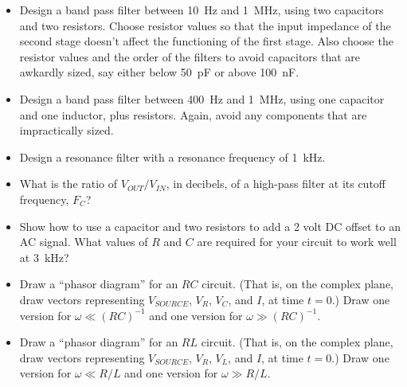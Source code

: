 \begin{itemize}

\item Design a band pass filter between 10~Hz and 1~MHz, using two capacitors and two resistors.  Choose resistor values so that the input impedance of the second stage doesn't affect the functioning of the first stage.  Also choose the resistor values and the order of the filters to avoid capacitors that are awkardly sized, say either below 50~pF or above 100~nF.

\item Design a band pass filter between 400~Hz and 1~MHz, using one capacitor and one inductor, plus resistors.  Again, avoid any components that are impractically sized.

\item Design a resonance filter with a resonance frequency of 1~kHz. 

\item What is the ratio of $V_{OUT}/V_{IN}$, in decibels, of a high-pass filter at its cutoff frequency, $F_C$?

\item Show how to use a capacitor and two resistors to add a 2 volt DC offset to an AC signal.  What values of $R$ and $C$ are required for your circuit to work well at 3~kHz?


\item Draw a ``phasor diagram'' for an $RC$ circuit.  (That is, on the complex plane, draw vectors representing $V_{SOURCE}$, $V_R$, $V_C$, and $I$, at time $t=0$.)  Draw one version for $\omega \ll (RC)^{-1}$ and one version for $\omega \gg (RC)^{-1}$.

\item Draw a ``phasor diagram'' for an $RL$ circuit.  (That is, on the complex plane, draw vectors representing $V_{SOURCE}$, $V_R$, $V_L$, and $I$, at time $t=0$.)  Draw one version for $\omega \ll R/L$ and one version for $\omega \gg R/L$.


\end{itemize}





